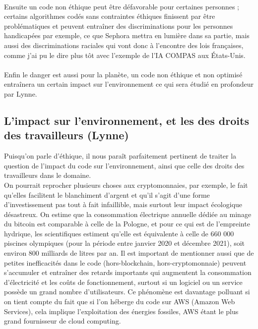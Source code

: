 \documentclass{article}
\begin{document}
\\Ensuite un code non éthique peut être défavorable pour certaines personnes ; certains algorithmes codés sans contraintes éthiques finissent par être problématiques et peuvent entraîner des discriminations pour les personnes handicapées par exemple, ce que Sephora mettra en lumière dans sa partie, mais aussi des discriminations raciales qui vont donc à l'encontre des lois françaises, comme j'ai pu le dire plus tôt avec l'exemple de l'IA COMPAS aux États-Unis.\\
\\Enfin le danger est aussi pour la planète, un code non éthique et non optimisé entraînera un certain impact sur l'environnement ce qui sera étudié en profondeur par Lynne.\\

\subsection{L'impact sur l'environnement, et les des droits des travailleurs (Lynne)} 
Puisqu’on parle d’éthique, il nous paraît parfaitement pertinent de traiter la question de l’impact du code sur l’environnement, ainsi que celle des droits des travailleurs dans le domaine.\\ 

On pourrait reprocher plusieurs choses aux cryptomonnaies, par exemple, le fait qu’elles facilitent le blanchiment d’argent et qu’il s’agit d’une forme d’investissement pas tout à fait infaillible, mais surtout leur impact écologique désastreux. On estime que la consommation électrique annuelle dédiée au minage du bitcoin est comparable à celle de la Pologne, et pour ce qui est de l’empreinte hydrique, les scientifiques estiment qu'elle est équivalente à celle de 660 000 piscines olympiques (pour la période entre janvier 2020 et décembre 2021), soit environ 800 milliards de litres par an. Il est important de mentionner aussi que de petites inefficacités dans le code (hors-blockchain, hors-cryptomonnaie) peuvent s’accumuler et entraîner des retards importants qui augmentent la consommation d'électricité et les coûts de fonctionnement, surtout si un logiciel ou un service possède un grand nombre d’utilisateurs. Ce phénomène est davantage polluant si on tient compte du fait que si l’on héberge du code sur AWS (Amazon Web Services), cela implique l’exploitation des énergies fossiles, AWS étant le plus grand fournisseur de cloud computing.\\
\end{document}
